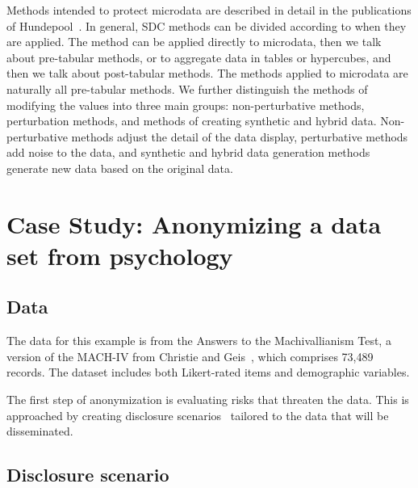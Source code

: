 \documentclass{article}
\begin{document}
Methods intended to protect microdata are described in detail in the publications of Hundepool~\cite{2012_Hundepool}. In general, SDC methods can be divided according to when they are applied. The method can be applied directly to microdata, then we talk about pre-tabular methods, or to aggregate data in tables or hypercubes, and then we talk about post-tabular methods. The methods applied to microdata are naturally all pre-tabular methods.
We further distinguish the methods of modifying the values into three main groups: non-perturbative methods, perturbation methods, and methods of creating synthetic and hybrid data. Non-perturbative methods adjust the detail of the data display, perturbative methods add noise to the data, and synthetic and hybrid data generation methods generate new data based on the original data. 
\newline

\section{Case Study: Anonymizing a data set from psychology}

\subsection{Data}
The data for this example is from the Answers to the Machivallianism Test, a version of the MACH-IV from Christie and Geis~\cite{Data}, which comprises 73,489 records.
The dataset includes both Likert-rated items and demographic variables.









\vspace{20\baselineskip}




The first step of anonymization is evaluating risks that threaten the data. This is approached by creating disclosure scenarios~\cite{2012_Hundepool} tailored to the data that will be disseminated. 



\subsection{Disclosure scenario}
\end{document}
